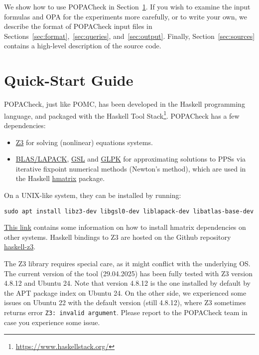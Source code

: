 \documentclass[9pt,a4paper]{article}
\begin{document}
We show how to use POPACheck in Section~\ref{sec:quick-start}.
If you wish to examine the input formulas and OPA for the experiments more carefully,
or to write your own, we describe the format of POPACheck input files in Sections~\ref{sec:format},~\ref{sec:queries}, and~\ref{sec:output}.
Finally, Section~\ref{sec:sources} contains a high-level description of the source code.

\section{Quick-Start Guide}
\label{sec:quick-start}

POPACheck, just like POMC, has been developed in the Haskell programming language,
and packaged with the Haskell Tool Stack\footnote{\url{https://www.haskellstack.org/}}.
POPACheck has a few dependencies:
\begin{itemize}
    \item \href{https://microsoft.github.io/z3guide/z3}{Z3} for solving (nonlinear) equations systems.
    \item \href{https://www.netlib.org/lapack/}{BLAS/LAPACK}, \href{ttps://www.gnu.org/software/gsl/}{GSL} and \href{https://www.gnu.org/software/glpk/}{GLPK} for approximating solutions to PPSs via iterative fixpoint numerical methods (Newton's method), which are used in the Haskell \href{https://hackage.haskell.org/package/hmatrix}{hmatrix} package.
\end{itemize}
On a UNIX-like system, they can be installed by running:
\begin{verbatim}
sudo apt install libz3-dev libgsl0-dev liblapack-dev libatlas-base-dev
\end{verbatim}

\href{https://github.com/haskell-numerics/hmatrix/blob/master/INSTALL.md}{This link} contains some information on how to install hmatrix dependencies on other systems.
Haskell bindings to Z3 are hosted on the Github repository \href{https://github.com/michiari/haskell-z3}{haskell-z3}.

The Z3 library requires special care, as it might conflict with the underlying OS. The current version of the tool (29.04.2025) has been fully tested with Z3 version 4.8.12 and Ubuntu 24. Note that version 4.8.12 is the one installed by default by the APT package index on Ubuntu 24. On the other side, we experienced some issues on Ubuntu 22 with the default version (still 4.8.12), where Z3 sometimes returns error \verb|Z3: invalid argument|. Please report to the POPACheck team in case you experience some issue.
\end{document}

